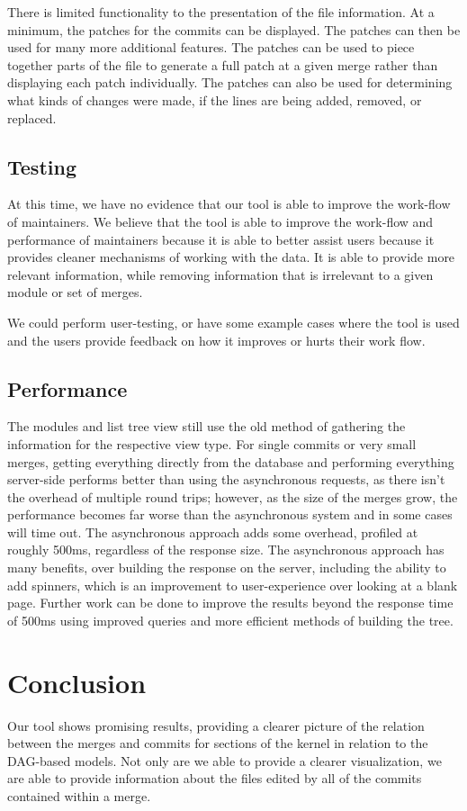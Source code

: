 \documentclass[conference, draftclsnofoot]{IEEEtran}
\begin{document}
There is limited functionality to the presentation of the file information. At
a minimum, the patches for the commits can be displayed. The patches can then
be used for many more additional features. The patches can be used to piece
together parts of the file to generate a full patch at a given merge rather
than displaying each patch individually. The patches can also be used for
determining what kinds of changes were made, if the lines are being added,
removed, or replaced.

\subsection{Testing}
At this time, we have no evidence that our tool is able to improve the
work-flow of maintainers. We believe that the tool is able to improve the
work-flow and performance of maintainers because it is able to better assist
users because it provides cleaner mechanisms of working with the data. It is
able to provide more relevant information, while removing information that is
irrelevant to a given module or set of merges.

We could perform user-testing, or have some example cases where the tool is
used and the users provide feedback on how it improves or hurts their work
flow.

\subsection{Performance}
The modules and list tree view still use the old method of gathering the
information for the respective view type. For single commits or very small
merges, getting everything directly from the database and performing everything
server-side performs better than using the asynchronous requests, as there
isn't the overhead of multiple round trips; however, as the size of the merges
grow, the performance becomes far worse than the asynchronous system and in
some cases will time out. The asynchronous approach adds some overhead,
profiled at roughly 500ms, regardless of the response size. The asynchronous
approach has many benefits, over building the response on the server, including
the ability to add spinners, which is an improvement to user-experience over
looking at a blank page. Further work can be done to improve the results beyond
the response time of 500ms using improved queries and more efficient methods of
building the tree.

\section{Conclusion}
Our tool shows promising results, providing a clearer picture of the relation
between the merges and commits for sections of the kernel in relation to the
DAG-based models. Not only are we able to provide a clearer visualization, we
are able to provide information about the files edited by all of the commits
contained within a merge.
\end{document}
